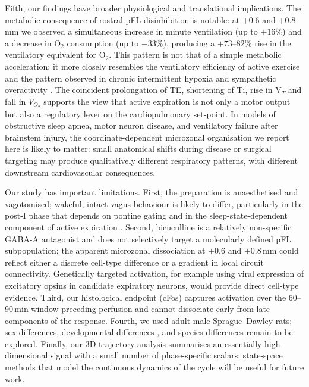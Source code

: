 \documentclass[11pt]{article}
\begin{document}
Fifth, our findings have broader physiological and translational
implications. The metabolic consequence of rostral-pFL disinhibition is
notable: at $+0.6$ and $+0.8$\,mm we observed a simultaneous increase in
minute ventilation (up to $+16\%$) and a decrease in O$_2$ consumption
(up to $-33\%$), producing a $+73$--$82\%$ rise in the ventilatory
equivalent for O$_2$. This pattern is not that of a simple metabolic
acceleration; it more closely resembles the ventilatory efficiency of
active exercise \citep{Boutin2017Respiratory,Iscoe1998Control} and the
pattern observed in chronic intermittent hypoxia and sympathetic
overactivity
\citep{Zoccal2018Expiratory,Barnett2017Partial}. The coincident
prolongation of TE, shortening of Ti, rise in V$_T$ and fall in $V_{O_2}$
supports the view that active expiration is not only a motor output but
also a regulatory lever on the cardiopulmonary set-point. In models of
obstructive sleep apnea, motor neuron disease, and ventilatory failure
after brainstem injury, the coordinate-dependent microzonal organisation
we report here is likely to matter: small anatomical shifts during
disease or surgical targeting may produce qualitatively different
respiratory patterns, with different downstream cardiovascular
consequences.

Our study has important limitations. First, the preparation is
anaesthetised and vagotomised; wakeful, intact-vagus behaviour is likely
to differ, particularly in the post-I phase that depends on pontine
gating \citep{Dutschmann2006Pontine,Dhingra2020LateE} and in the
sleep-state-dependent component of active expiration
\citep{Pisanski2020Parafacial}. Second, bicuculline is a relatively
non-specific GABA-A antagonist and does not selectively target a
molecularly defined pFL subpopulation; the apparent microzonal
dissociation at $+0.6$ and $+0.8$\,mm could reflect either a discrete
cell-type difference or a gradient in local circuit connectivity.
Genetically targeted activation, for example using viral expression of
excitatory opsins in candidate expiratory neurons, would provide direct
cell-type evidence. Third, our histological endpoint (cFos) captures
activation over the 60--90\,min window preceding perfusion and cannot
dissociate early from late components of the response. Fourth, we used
adult male Sprague--Dawley rats; sex differences, developmental
differences \citep{deBritto2017GABAergic,Pisanski2019Parafacial}, and
species differences \citep{delNegro2018Breathing} remain to be explored.
Finally, our 3D trajectory analysis summarises an essentially
high-dimensional signal with a small number of phase-specific scalars;
state-space methods that model the continuous dynamics of the cycle
\citep{Molkov2010Computational,Barnett2017Partial,Dhingra2020LateE} will
be useful for future work.
\end{document}
